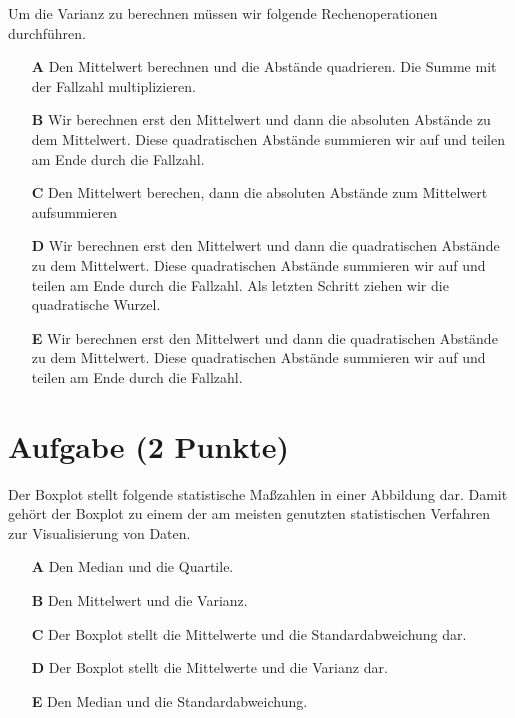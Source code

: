 \documentclass[a4paper, 9pt]{scrartcl}\usepackage[]{graphicx}\usepackage[]{xcolor}
\begin{document}
Um die Varianz zu berechnen müssen wir folgende Rechenoperationen durchführen.



\begin{enumerate}
\item [\textbf{A} \msquare] Den Mittelwert berechnen und die Abstände quadrieren. Die Summe mit der Fallzahl multiplizieren.
\item [\textbf{B} \msquare] Wir berechnen erst den Mittelwert und dann die absoluten Abstände zu dem Mittelwert. Diese quadratischen Abstände summieren wir auf und teilen am Ende durch die Fallzahl.
\item [\textbf{C} \msquare] Den Mittelwert berechen, dann die absoluten Abstände zum Mittelwert aufsummieren
\item [\textbf{D} \msquare] Wir berechnen erst den Mittelwert und dann die quadratischen Abstände zu dem Mittelwert. Diese quadratischen Abstände summieren wir auf und teilen am Ende durch die Fallzahl. Als letzten Schritt ziehen wir die quadratische Wurzel.
\item [\textbf{E} \msquare] Wir berechnen erst den Mittelwert und dann die quadratischen Abstände zu dem Mittelwert. Diese quadratischen Abstände summieren wir auf und teilen am Ende durch die Fallzahl.
\end{enumerate} 

\section{Aufgabe \hfill (2 Punkte)}



Der Boxplot stellt folgende statistische Maßzahlen in einer Abbildung dar. Damit gehört der Boxplot zu einem der am meisten genutzten statistischen Verfahren zur Visualisierung von Daten.

 



\begin{enumerate}
\item [\textbf{A} \msquare] Den Median und die Quartile.
\item [\textbf{B} \msquare] Den Mittelwert und die Varianz.
\item [\textbf{C} \msquare] Der Boxplot stellt die Mittelwerte und die Standardabweichung dar.
\item [\textbf{D} \msquare] Der Boxplot stellt die Mittelwerte und die Varianz dar.
\item [\textbf{E} \msquare] Den Median und die Standardabweichung.
\end{enumerate}
\end{document}
